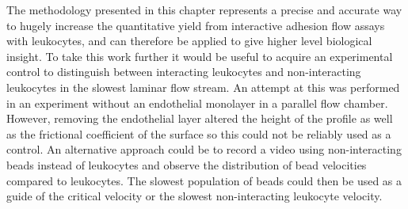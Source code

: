 The methodology presented in this chapter represents a precise and accurate way to hugely increase the quantitative yield from interactive adhesion flow assays with leukocytes, and can therefore be applied to give higher level biological insight. To take this work further it would be useful to acquire an experimental control to distinguish between interacting leukocytes and non-interacting leukocytes in the slowest laminar flow stream. An attempt at this was performed in an experiment without an endothelial monolayer in a parallel flow chamber. However, removing the endothelial layer altered the height of the profile as well as the frictional coefficient of the surface so this could not be reliably used as a control. An alternative approach could be to record a video using non-interacting beads instead of leukocytes and observe the distribution of bead velocities compared to leukocytes. The slowest population of beads could then be used as a guide of the critical velocity or the slowest non-interacting leukocyte velocity.

